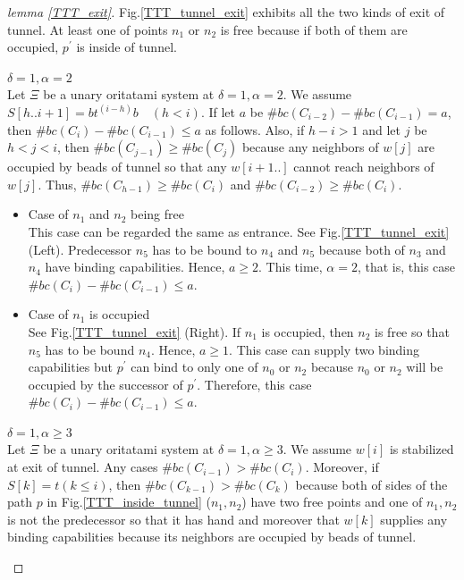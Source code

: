 \documentclass[runningheads]{llncs}
\begin{document}
\begin{proof}[lemma \ref{TTT_exit}]
Fig.\ref{TTT_tunnel_exit} exhibits all the two kinds of exit of tunnel. 
At least one of points $n_1$ or $n_2$ is free because if both of them are occupied, $p^\prime$ is inside of tunnel.

\begin{paragraph}{}
$\delta = 1, \alpha = 2$\\
Let $\Xi$ be a unary oritatami system at $\delta = 1, \alpha = 2$. We assume $S[h..i+1] = bt^{(i-h)}b \quad (h<i)$.
If let $a$ be $\#bc(C_{i-2}) - \#bc(C_{i-1}) = a$, then $\#bc(C_{i}) - \#bc(C_{i-1}) \leq a$ as follows. Also, if $h - i > 1$ and let $j$ be $h<j<i$, then $\#bc(C_{j-1}) \geq \#bc(C_{j})$ because any neighbors of $w[j]$ are occupied by beads of tunnel so that any $w[i+1..]$ cannot reach neighbors of $w[j]$. Thus, $\#bc(C_{h-1}) \geq \#bc(C_i)$ and $\#bc(C_{i-2}) \geq \#bc(C_i)$.
\end{paragraph}

\begin{itemize}
\item{Case of $n_1$ and $n_2$ being free}\\
  This case can be regarded the same as entrance. See Fig.\ref{TTT_tunnel_exit} (Left). Predecessor $n_5$ has to be bound to $n_4$ and $n_5$ because both of $n_3$ and $n_4$ have binding capabilities. Hence, $a \geq 2$. This time, $\alpha = 2$, that is, this case $\#bc(C_{i}) - \#bc(C_{i-1}) \leq a$.
  
\item{Case of $n_1$ is occupied}\\
  See Fig.\ref{TTT_tunnel_exit} (Right). If $n_1$ is occupied, then $n_2$ is free so that $n_5$ has to be bound $n_4$. Hence,  $a \geq 1$. This case can supply two binding capabilities but $p^\prime$ can bind to only one of $n_0$ or $n_2$ because $n_0$ or $n_2$ will be occupied by the successor of $p^\prime$. Therefore, this case $\#bc(C_{i}) - \#bc(C_{i-1}) \leq a$.
  
\end{itemize}

\begin{paragraph}{}
$\delta = 1, \alpha \geq 3$\\
Let $\Xi$ be a unary oritatami system at $\delta = 1, \alpha \geq 3$. We assume $w[i]$ is stabilized at exit of tunnel.
Any cases $\#bc(C_{i-1}) > \#bc(C_{i})$. Moreover, if $S[k] = t (k \leq i)$, then $\#bc(C_{k-1}) > \#bc(C_{k})$ because both of sides of the path $p$ in Fig.\ref{TTT_inside_tunnel} ($n_1, n_2$) have two free points and one of $n_1, n_2$ is not the predecessor so that it has hand and moreover that $w[k]$ supplies any binding capabilities because its neighbors are occupied by beads of tunnel.
\end{paragraph}


\end{proof}
\end{document}
